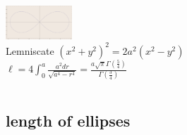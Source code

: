 \documentclass[10pt,handout]{beamer} %
\theoremstyle{definition}
\begin{document}
\begin{frame}
\begin{columns}[c]
\begin{column}{4cm}
\includegraphics[width=2.5cm]{images/lemniscate.pdf}\\
{\scriptsize Lemniscate $(x^2+y^2)^2=2a^2(x^2-y^2)$}\\
{$\ell=4\int_0^a\frac{a^2dr}{\sqrt{a^4-r^4}}=\frac{a \sqrt\pi\Gamma(\frac54)}{\Gamma(\frac34)}$}
\end{column}
\end{columns}
\end{frame}

\subsection{length of ellipses}
\end{document}
